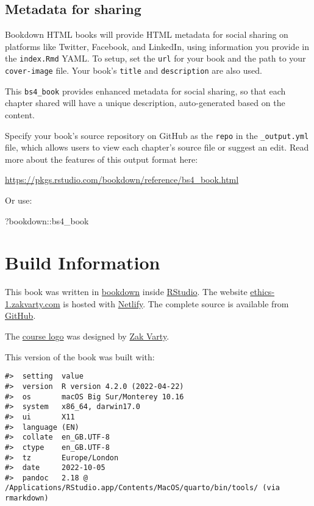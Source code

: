 \documentclass[
]{book}
\newenvironment{Shaded}{\begin{snugshade}}{\end{snugshade}}
\newcommand{\NormalTok}[1]{#1}
\newcommand{\SpecialCharTok}[1]{\textcolor[rgb]{0.00,0.00,0.00}{#1}}
\theoremstyle{definition}
\theoremstyle{definition}
\theoremstyle{definition}
\theoremstyle{definition}
\theoremstyle{remark}
\begin{document}
\hypertarget{metadata-for-sharing}{%
\section{Metadata for sharing}\label{metadata-for-sharing}}

Bookdown HTML books will provide HTML metadata for social sharing on platforms like Twitter, Facebook, and LinkedIn, using information you provide in the \texttt{index.Rmd} YAML. To setup, set the \texttt{url} for your book and the path to your \texttt{cover-image} file. Your book's \texttt{title} and \texttt{description} are also used.

This \texttt{bs4\_book} provides enhanced metadata for social sharing, so that each chapter shared will have a unique description, auto-generated based on the content.

Specify your book's source repository on GitHub as the \texttt{repo} in the \texttt{\_output.yml} file, which allows users to view each chapter's source file or suggest an edit. Read more about the features of this output format here:

\url{https://pkgs.rstudio.com/bookdown/reference/bs4_book.html}

Or use:

\begin{Shaded}
\begin{Highlighting}[]
\NormalTok{?bookdown}\SpecialCharTok{::}\NormalTok{bs4\_book}
\end{Highlighting}
\end{Shaded}

\hypertarget{build-information}{%
\chapter*{Build Information}\label{build-information}}

This book was written in \href{http://bookdown.org/}{bookdown} inside \href{http://www.rstudio.com/ide/}{RStudio}. The website \href{https://ethics-1.zakvarty.com}{ethics-1.zakvarty.com} is hosted with \href{https://www.netlify.com}{Netlify}. The complete source is available from \href{https://github.com/zakvarty/ethics-1}{GitHub}.

The \href{assets/ethics-1-logo.png}{course logo} was designed by \href{https://www.zakvarty.com/}{Zak Varty}.

This version of the book was built with:

\begin{verbatim}
#>  setting  value
#>  version  R version 4.2.0 (2022-04-22)
#>  os       macOS Big Sur/Monterey 10.16
#>  system   x86_64, darwin17.0
#>  ui       X11
#>  language (EN)
#>  collate  en_GB.UTF-8
#>  ctype    en_GB.UTF-8
#>  tz       Europe/London
#>  date     2022-10-05
#>  pandoc   2.18 @ /Applications/RStudio.app/Contents/MacOS/quarto/bin/tools/ (via rmarkdown)
\end{verbatim}
\end{document}
